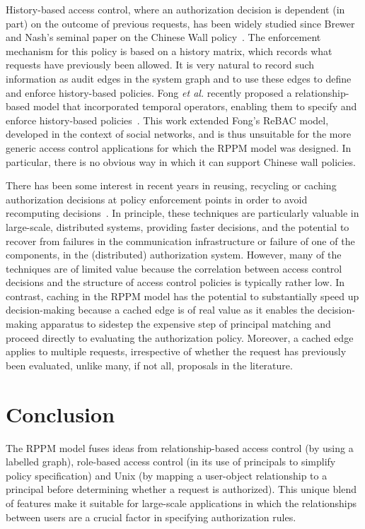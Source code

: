 \documentclass{article}
\begin{document}
History-based access control, where an authorization decision is dependent (in part) on the outcome of previous requests, has been widely studied since Brewer and Nash's seminal paper on the Chinese Wall policy~\cite{BrewerN89}.
The enforcement mechanism for this policy is based on a history matrix, which records what requests have previously been allowed.
It is very natural to record such information as audit edges in the system graph and to use these edges to define and enforce history-based policies.
Fong {\em et al.} recently proposed a relationship-based model that incorporated temporal operators, enabling them to specify and enforce history-based policies~\cite{FoMeKr13}.
This work extended Fong's ReBAC model, developed in the context of social networks, and is thus unsuitable for the more generic access control applications for which the RPPM model was designed.
In particular, there is no obvious way in which it can support Chinese wall policies.

There has been some interest in recent years in reusing, recycling or caching authorization decisions at policy enforcement points in order to avoid recomputing decisions~\cite{BordersZP05,KohlerBS09,KohlerF09,WeiCB11}.
In principle, these techniques are particularly valuable in large-scale, distributed systems, providing faster decisions, and the potential to recover from failures in the communication infrastructure or failure of one of the components, in the (distributed) authorization system.
However, many of the techniques are of limited value because the correlation between access control decisions and the structure of access control policies is typically rather low.
In contrast, caching in the RPPM model has the potential to substantially speed up decision-making because a cached edge is of real value as it enables the decision-making apparatus to sidestep the expensive step of principal matching and proceed directly to evaluating the authorization policy.
Moreover, a cached edge applies to multiple requests, irrespective of whether the request has previously been evaluated, unlike many, if not all, proposals in the literature.

\section{Conclusion}\label{sec:conclusion}

The RPPM model fuses ideas from relationship-based access control (by using a labelled graph), role-based access control (in its use of principals to simplify policy specification) and Unix (by mapping a user-object relationship to a principal before determining whether a request is authorized).
This unique blend of features make it suitable for large-scale applications in which the relationships between users are a crucial factor in specifying authorization rules.
\end{document}
